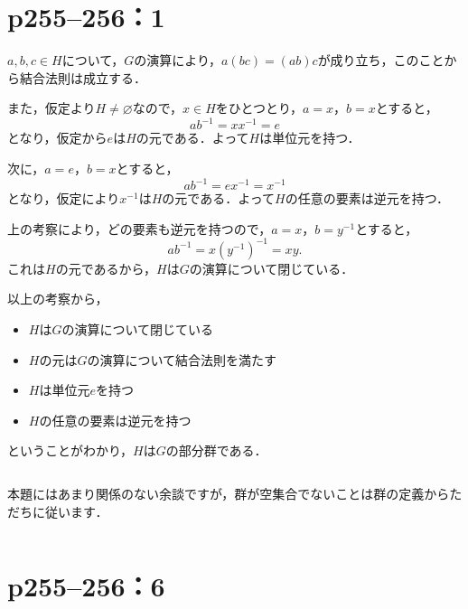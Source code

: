 \section*{p255--256：1}
\begin{tproof}
  $a,b,c \in H$について，$G$の演算により，$a(bc)=(ab)c$が成り立ち，このことから結合法則は成立する．

  また，仮定より$H \ne \varnothing $なので，$x \in H$をひとつとり，$a=x$，$b=x$とすると，
  \[
    ab^{-1} = x x^{-1}=e
  \]
  となり，仮定から$e$は$H$の元である．よって$H$は単位元を持つ．

  次に，$ a=e$，$b=x$とすると，
  \[
    ab^{-1}=ex^{-1}=x^{-1}
  \]
  となり，仮定により$x^{-1}$は$H$の元である．よって$H$の任意の要素は逆元を持つ．

  上の考察により，どの要素も逆元を持つので，$a=x$，$b=y^{-1}$とすると，
  \[
    ab^{-1}=x(y^{-1})^{-1} = xy.
  \]
  これは$H$の元であるから，$H$は$G$の演算について閉じている．

  以上の考察から，
  \begin{itemize}
    \item $H$は$G$の演算について閉じている
    \item $H$の元は$G$の演算について結合法則を満たす
    \item $H$は単位元$e$を持つ
    \item $H$の任意の要素は逆元を持つ
  \end{itemize}
  ということがわかり，$H$は$G$の部分群である．
\end{tproof}

\begin{column}
  本題にはあまり関係のない余談ですが，群が空集合でないことは群の定義からただちに従います．
\end{column}


\section*{p255--256：6}


